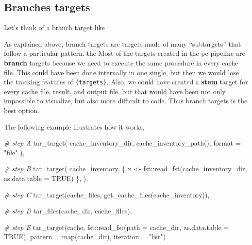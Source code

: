 \documentclass[
]{book}
\newenvironment{Shaded}{\begin{snugshade}}{\end{snugshade}}
\newcommand{\AttributeTok}[1]{\textcolor[rgb]{0.77,0.63,0.00}{#1}}
\newcommand{\CommentTok}[1]{\textcolor[rgb]{0.56,0.35,0.01}{\textit{#1}}}
\newcommand{\ConstantTok}[1]{\textcolor[rgb]{0.00,0.00,0.00}{#1}}
\newcommand{\FunctionTok}[1]{\textcolor[rgb]{0.00,0.00,0.00}{#1}}
\newcommand{\NormalTok}[1]{#1}
\newcommand{\OtherTok}[1]{\textcolor[rgb]{0.56,0.35,0.01}{#1}}
\newcommand{\SpecialCharTok}[1]{\textcolor[rgb]{0.00,0.00,0.00}{#1}}
\newcommand{\StringTok}[1]{\textcolor[rgb]{0.31,0.60,0.02}{#1}}
\begin{document}
\hypertarget{branches-targets}{%
\subsection*{Branches targets}\label{branches-targets}}

Let's think of a branch target like

As explained above, branch targets are targets made of many ``subtargets'' that
follow a particular pattern. the Most of the targets created in the pc pipeline
are \textbf{branch} targets because we need to execute the same procedure in every
cache file. This could have been done internally in one single, but then we
would lose the tracking features of \texttt{\{targets\}}. Also, we could have created a
\textbf{stem} target for every cache file, result, and output file, but that would
have been not only impossible to visualize, but also more difficult to code.
Thus branch targets is the best option.

The following example illustrates how it works,

\begin{Shaded}
\begin{Highlighting}[]

\CommentTok{\# step A}
\FunctionTok{tar\_target}\NormalTok{(}
\NormalTok{  cache\_inventory\_dir, }
  \FunctionTok{cache\_inventory\_path}\NormalTok{(),}
  \AttributeTok{format =} \StringTok{"file"}
\NormalTok{),}

\CommentTok{\# step B}
\FunctionTok{tar\_target}\NormalTok{(}
\NormalTok{  cache\_inventory, }
\NormalTok{  \{}
\NormalTok{    x }\OtherTok{\textless{}{-}}\NormalTok{ fst}\SpecialCharTok{::}\FunctionTok{read\_fst}\NormalTok{(cache\_inventory\_dir, }
                       \AttributeTok{as.data.table =} \ConstantTok{TRUE}\NormalTok{)}
\NormalTok{  \},}
\NormalTok{),}

\CommentTok{\# step C}
\FunctionTok{tar\_target}\NormalTok{(cache\_files,}
           \FunctionTok{get\_cache\_files}\NormalTok{(cache\_inventory)),}

\CommentTok{\# step D}
\FunctionTok{tar\_files}\NormalTok{(cache\_dir, cache\_files),}

\CommentTok{\# step E}
\FunctionTok{tar\_target}\NormalTok{(cache, }
\NormalTok{           fst}\SpecialCharTok{::}\FunctionTok{read\_fst}\NormalTok{(}\AttributeTok{path =}\NormalTok{ cache\_dir, }
                         \AttributeTok{as.data.table =} \ConstantTok{TRUE}\NormalTok{), }
           \AttributeTok{pattern =} \FunctionTok{map}\NormalTok{(cache\_dir), }
           \AttributeTok{iteration =} \StringTok{"list"}\NormalTok{)}
\end{Highlighting}
\end{Shaded}
\end{document}
